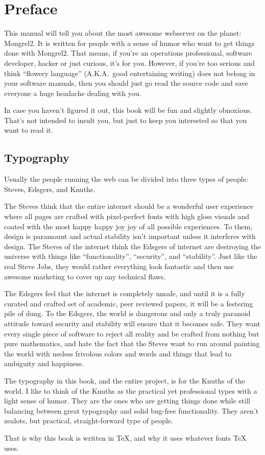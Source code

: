 \chapter{Preface}

This manual will tell you about the most awesome webserver on the planet:
Mongrel2.  It is written for people with a sense of humor who want to get
things done with Mongrel2.  That means, if you're an operations professional,
software developer, hacker or just curious, it's for you.  However, if you're
too serious and think ``flowery language'' (A.K.A.\ good entertaining writing) does
not belong in your software manuals, then you should just go read the source
code and save everyone a huge headache dealing with you.

In case you haven't figured it out, this book will be fun and slightly
obnoxious.  That's not intended to insult you, but just to keep you interested
so that you want to read it.


\section*{Typography}

Usually the people running the web can be divided into three types of people:  Steves,
Edsgers, and Knuths.

The Steves think that the entire internet should be a wonderful user experience
where all pages are crafted with pixel-perfect fonts with high gloss visuals
and coated with the most happy happy joy joy of all possible experiences.  To
them, design is paramount and actual stability isn't important unless it
interferes with design.  The Steves of the internet think the Edsgers of
internet are destroying the universe with things like ``functionality'',
``security'', and ``stability''.  Just like the real Steve Jobs, they would rather
everything look fantastic and then use awesome marketing to cover up any
technical flaws.

The Edsgers feel that the internet is completely unsafe, and until it is a fully
curated and crafted set of academic, peer reviewed papers, it will be a festering
pile of dung.  To the Edsgers, the world is dangerous and only a truly paranoid
attitude toward security and stability will ensure that it becomes safe.  They
want every single piece of software to reject all reality and be crafted from
nothing but pure mathematics, and hate the fact that the Steves want to run
around painting the world with useless frivolous colors and words and things
that lead to ambiguity and happiness.

The typography in this book, and the entire project, is for the Knuths of the
world.  I like to think of the Knuths as the practical yet professional types
with a light sense of humor.  They are the ones who are getting things done
while still balancing between great typography and solid bug-free
functionality.  They aren't zealots, but practical, straight-forward type of
people.

That is why this book is written in \TeX, and why it uses whatever fonts \TeX{} uses.

